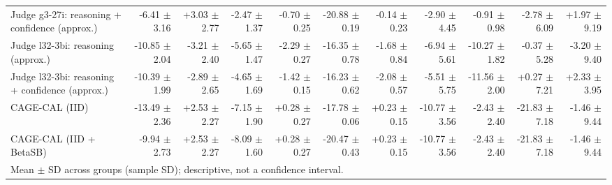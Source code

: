 \begin{tabular}{lrrrrrrrrrr}
Judge g3-27i: reasoning + confidence (approx.) & -6.41 {\scriptsize $\pm$ 3.16} & +3.03 {\scriptsize $\pm$ 2.77} & -2.47 {\scriptsize $\pm$ 1.37} & -0.70 {\scriptsize $\pm$ 0.25} & -20.88 {\scriptsize $\pm$ 0.19} & -0.14 {\scriptsize $\pm$ 0.23} & -2.90 {\scriptsize $\pm$ 4.45} & -0.91 {\scriptsize $\pm$ 0.98} & -2.78 {\scriptsize $\pm$ 6.09} & +1.97 {\scriptsize $\pm$ 9.19} \\
Judge l32-3bi: reasoning (approx.) & -10.85 {\scriptsize $\pm$ 2.04} & -3.21 {\scriptsize $\pm$ 2.40} & -5.65 {\scriptsize $\pm$ 1.47} & -2.29 {\scriptsize $\pm$ 0.27} & -16.35 {\scriptsize $\pm$ 0.78} & -1.68 {\scriptsize $\pm$ 0.84} & -6.94 {\scriptsize $\pm$ 5.61} & -10.27 {\scriptsize $\pm$ 1.82} & -0.37 {\scriptsize $\pm$ 5.28} & -3.20 {\scriptsize $\pm$ 9.40} \\
Judge l32-3bi: reasoning + confidence (approx.) & -10.39 {\scriptsize $\pm$ 1.99} & -2.89 {\scriptsize $\pm$ 2.65} & -4.65 {\scriptsize $\pm$ 1.69} & -1.42 {\scriptsize $\pm$ 0.15} & -16.23 {\scriptsize $\pm$ 0.62} & -2.08 {\scriptsize $\pm$ 0.57} & -5.51 {\scriptsize $\pm$ 5.75} & -11.56 {\scriptsize $\pm$ 2.00} & +0.27 {\scriptsize $\pm$ 7.21} & +2.33 {\scriptsize $\pm$ 3.95} \\
CAGE-CAL (IID) & -13.49 {\scriptsize $\pm$ 2.36} & +2.53 {\scriptsize $\pm$ 2.27} & -7.15 {\scriptsize $\pm$ 1.90} & +0.28 {\scriptsize $\pm$ 0.27} & -17.78 {\scriptsize $\pm$ 0.06} & +0.23 {\scriptsize $\pm$ 0.15} & -10.77 {\scriptsize $\pm$ 3.56} & -2.43 {\scriptsize $\pm$ 2.40} & -21.83 {\scriptsize $\pm$ 7.18} & -1.46 {\scriptsize $\pm$ 9.44} \\
CAGE-CAL (IID + BetaSB) & -9.94 {\scriptsize $\pm$ 2.73} & +2.53 {\scriptsize $\pm$ 2.27} & -8.09 {\scriptsize $\pm$ 1.60} & +0.28 {\scriptsize $\pm$ 0.27} & -20.47 {\scriptsize $\pm$ 0.43} & +0.23 {\scriptsize $\pm$ 0.15} & -10.77 {\scriptsize $\pm$ 3.56} & -2.43 {\scriptsize $\pm$ 2.40} & -21.83 {\scriptsize $\pm$ 7.18} & -1.46 {\scriptsize $\pm$ 9.44} \\
\bottomrule
\multicolumn{11}{l}{\scriptsize Mean $\pm$ SD across groups (sample SD); descriptive, not a confidence interval.} \\
\end{tabular}
